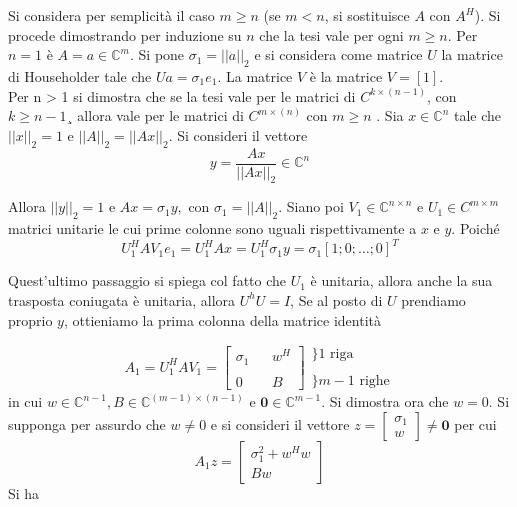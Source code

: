 \begin{thproof} Si considera per semplicit\`a il caso $m \geq n$ (se
$m < n$, si sostituisce $A$ con $A^H$). Si procede dimostrando per
induzione su $n$ che la tesi vale per ogni $m \geq n$.  Per $n = 1$
\`e $A = a \in \mathbb{C}^m$.  Si pone $\sigma_1 = ||a||_2$ e si
considera come matrice $U$ la matrice di Householder tale che $Ua =
\sigma_1e_1$. La matrice $V$ \`e la matrice $V = [1]$.  \\ Per n > 1
si dimostra che se la tesi vale per le matrici di $C^{k \times
(n-1)}$, con $k \geq n-1$¸ allora vale per le matrici di $C^{m \times
(n)}$ con $m \geq n$ . Sia $ x \in \mathbb{C}^{n}$ tale che $||x||_2 =
1 $ e $||A||_2 = ||Ax||_2$.  Si consideri il vettore
 $$y = \dfrac{Ax}{||Ax||_2} \in \mathbb{C}^{n}$$

Allora $||y||_2 = 1$ e $Ax = \sigma_1y,$ con $\sigma_1 =
||A||_2$. Siano poi $V_1 \in \mathbb{C}^{n \times n} $ e $U_1 \in C^{m
\times m}$ matrici unitarie le cui prime colonne sono uguali
rispettivamente a $x$ e $y$. Poich\'e
$$U_1^{H} AV_1e_1 = U_1^H Ax 
= U_1^{H} \sigma_1 y = \sigma_1[1; 0; \ldots ; 0]^T $$
\begin{notes}
Quest'ultimo passaggio si spiega col fatto
che $U_1$ \`e unitaria, allora anche la sua trasposta
coniugata \`e unitaria, allora $U^{h} U = I$, Se al posto
di $U$ prendiamo proprio $y$, ottieniamo la prima colonna
della matrice identit\`a
\end{notes}

$$
 A_1 = U_1^{H}AV_1 = \left[
\begin{array}{lll} \sigma_1 & & w^{H} \\ & & \\ 0 & & B
\end{array} \right]
\begin{array}{l} \}1 \text{ riga} \\ \\ \}m-1 \text{ righe}
\end{array}
$$
in cui $w \in \mathbb{C}^{n−1}, B \in \mathbb{C}^{(m−1)\times(n−1) }$
e $\mathbf{0} \in \mathbb{C}^{m−1}$.  Si dimostra ora che $w = 0$. Si
supponga per assurdo che $w \neq 0$ e si consideri il vettore $z =
\left[
 \begin{array}{l} \sigma_1 \\ w
\end{array} \right] \neq \mathbf{0} $ per cui
$$
A_1z = \left[
  \begin{array}{c} \sigma_1^{2} + w^{H}w \\ Bw
  \end{array} \right]
$$
 Si ha


\end{thproof}

